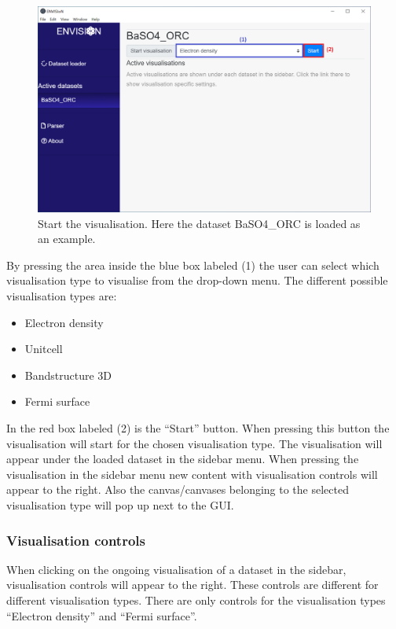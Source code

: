 \begin{figure}[H]
    \centering
    \includegraphics[scale = 0.45]{images/GUI_Chosevistype.png}
    \caption{Start the visualisation. Here the dataset BaSO4\_ORC is loaded as an example.}
    \label{fig:GUIChosevistype}
\end{figure}

By pressing the area inside the blue box labeled (1) the user can select which visualisation type to visualise from the drop-down menu. The different possible visualisation types are: 

\begin{itemize}
    \item Electron density
    \item Unitcell
    \item Bandstructure 3D
    \item Fermi surface
\end{itemize}

In the red box labeled (2) is the ``Start'' button. When pressing this button the visualisation will start for the chosen visualisation type. The visualisation will appear under the loaded dataset in the sidebar menu. When pressing the visualisation in the sidebar menu new content with visualisation controls will appear to the right. Also the canvas/canvases belonging to the selected visualisation type will pop up next to the GUI.

\subsubsection{Visualisation controls}
When clicking on the ongoing visualisation of a dataset in the sidebar, visualisation controls will appear to the right. These controls are different for different visualisation types. There are only controls for the visualisation types ``Electron density'' and ``Fermi surface''. 

